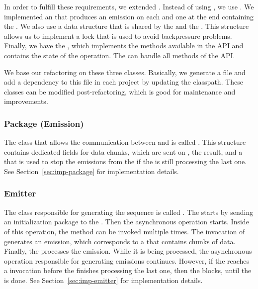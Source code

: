 \documentclass[type=bsc,accentcolor=tud9c]{tudthesis}
\begin{document}
In order to fulfill these requirements, we extended . Instead of using , we use . We implemented an  that produces an emission on each  and one at the end containing the . We also use a data structure that is shared by the  and the . This structure allows us to implement a lock that is used to avoid backpressure problems. Finally, we have the , which implements the methods available in the  API and contains the state of the operation. The  can handle all methods of the  API.

We base our refactoring on these three classes. Basically, we generate a  file and add a dependency to this file in each project by updating the classpath. These classes can be modified post-refactoring, which is good for maintenance and improvements.

\subsubsection{Package (Emission)}
The class that allows the communication between  and  is called . This structure contains dedicated fields for data chunks, which are sent on , the result, and a  that is used to stop the emissions from the  if the  is still processing the last one. See Section~\ref{sec:imp-package} for implementation details.

\subsubsection{Emitter}
The class responsible for generating the sequence is called . The  starts by sending an initialization package to the . Then the asynchronous operation starts. Inside of this operation, the method  can be invoked multiple times. The invocation of  generates an emission, which corresponds to a  that contains chunks of data. Finally, the  processes the emission. While it is being processed, the asynchronous operation responsible for generating emissions continues. However, if the  reaches a  invocation before the  finishes processing the last one, then the  blocks, until the  is done. See Section~\ref{sec:imp-emitter}  for implementation details.
\end{document}
